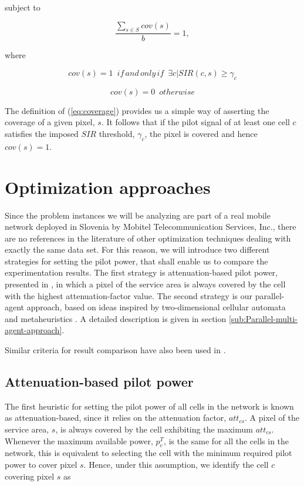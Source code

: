 subject to

\begin{equation}
\frac{\sum_{s\in S}cov(s)}{b}=1,\label{eq:coverage_constraint}
\end{equation}


where

\begin{equation}
cov(s)=1\,\,\, if\, and\, only\, if\,\,\,\exists c\vert SIR(c,s)\ge\gamma_{c}\label{eq:coverage}
\end{equation}


\[
cov(s)=0\,\,\, otherwise
\]


The definition of (\ref{eq:coverage}) provides us a simple way of
asserting the coverage of a given pixel, $s$. It follows that if
the pilot signal of at least one cell $c$ satisfies the imposed $SIR$
threshold, $\gamma_{c}$, the pixel is covered and hence $cov(s)=1$.


\section{Optimization approaches \label{sec:Solution-approaches}}

Since the problem instances we will be analyzing are part of a real
mobile network deployed in Slovenia by Mobitel Telecommunication Services,
Inc., there are no references in the literature of other optimization
techniques dealing with exactly the same data set. For this reason,
we will introduce two different strategies for setting the pilot power,
that shall enable us to compare the experimentation results. The first
strategy is attenuation-based pilot power, presented in \cite{Siomina_Pilot.power.optimization:2004},
in which a pixel of the service area is always covered by the cell
with the highest attenuation-factor value. The second strategy is
our parallel-agent approach, based on ideas inspired by two-dimensional
cellular automata \cite{Sarkar_Cellular.automata.history:2000} and
metaheuristics \cite{Talbi_Metaheuristics:2009}. A detailed description
is given in section \ref{sub:Parallel-multi-agent-approach}.

Similar criteria for result comparison have also been used in \cite{Siomina:Minimum.pilot.power.for.service.coverage}.


\subsection{Attenuation-based pilot power}

The first heuristic for setting the pilot power of all cells in the
network is known as attenuation-based, since it relies on the attenuation
factor, $att_{cs}$. A pixel of the service area, $s$, is always
covered by the cell exhibiting the maximum $att_{cs}$. Whenever the
maximum available power, $p_{c}^{T}$, is the same for all the cells
in the network, this is equivalent to selecting the cell with the
minimum required pilot power to cover pixel $s$. Hence, under this
assumption, we identify the cell $c$ covering pixel $s$ as

